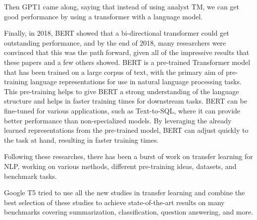 Then GPT1 \cite{Radford2018ImprovingLU} came along, saying that instead of using analyst TM, we can get good performance by using a transformer with a language model.

Finally, in 2018, \ac{BERT} \cite{devlin-etal-2019-bert} showed that a bi-directional transformer could get outstanding performance, and by the end of 2018, many researchers were convinced that this was the path forward, given all of the impressive results that these papers and a few others showed. BERT is a pre-trained Transformer model that has been trained on a large corpus of text, with the primary aim of pre-training language representations for use in natural language processing tasks\cite{devlin-etal-2019-bert}. This pre-training helps to give BERT a strong understanding of the language structure and helps in faster training times for downstream tasks. BERT can be fine-tuned for various applications, such as Text-to-SQL, where it can provide better performance than non-specialized models. By leveraging the already learned representations from the pre-trained model, BERT can adjust quickly to the task at hand, resulting in faster training times.

Following these researches, there has been a burst of work on transfer learning for NLP, working on various methods, different pre-training ideas, datasets, and benchmark tasks.

Google T5 \cite{raffel_exploring_2020} tried to use all the new studies in transfer learning and combine the best selection of these studies to achieve state-of-the-art results on many benchmarks covering summarization, classification, question answering, and more.